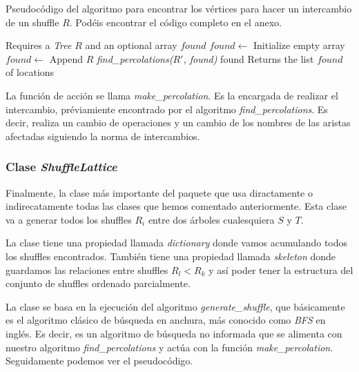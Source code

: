 \documentclass[../main.tex]{subfiles}
\begin{document}
\begin{algorithm}
    \caption{Pseudoc\'odigo del algoritmo para encontrar los v\'ertices para hacer un intercambio de un shuffle $R$. Pod\'eis encontrar el c\'odigo completo en el anexo.}
    \begin{algorithmic}[1]
        \Require Requires a \emph{Tree} $R$ and an optional array $found$
         
        \State $found \leftarrow$ Initialize empty array
        \EndIf
         
        \State\Break
        \EndIf
        \EndFor
        \ForElse {}
        \State $found\leftarrow$ Append $R$
        \EndForElse
        \EndIf
        \State\emph{find\_percolations($R'$, found)} 
        \EndFor
        \State\Return found
        \EndFunction
        \Ensure Returns the list $found$ of locations
    \end{algorithmic}
\end{algorithm}

La funci\'on de acci\'on se llama \emph{make\_percolation}. Es la encargada de realizar el intercambio, pr\'eviamiente encontrado por el algoritmo \emph{find\_percolations}. Es decir, realiza un cambio de operaciones y un cambio de los nombres de las aristas afectadas siguiendo la norma de intercambios.

\subsubsection*{Clase \emph{ShuffleLattice}}
Finalmente, la clase m\'as importante del paquete que usa diractamente o indirecatamente todas las clases que hemos comentado anteriormente. Esta clase va a generar todos los shuffles $R_i$ entre dos \'arboles cualesquiera $S$ y $T$.

La clase tiene una propiedad llamada \emph{dictionary} donde vamos acumulando todos los shuffles encontrados. Tambi\'en tiene una propiedad llamada \emph{skeleton} donde guardamos las relaciones entre shuffles $R_l < R_k$ y as\'i poder tener la estructura del conjunto de shuffles ordenado parcialmente.

La clase se basa en la ejecuci\'on del algoritmo \emph{generate\_shuffle}, que b\'asicamente es el algoritmo cl\'asico de b\'usqueda en anchura, m\'as conocido como \emph{BFS} en ingl\'es. Es decir, es un algoritmo de b\'usqueda no informada que se alimenta con nuestro algoritmo \emph{find\_percolations} y act\'ua con la funci\'on \emph{make\_percolation}.
Seguidamente podemos ver el pseudoc\'odigo.
\end{document}
